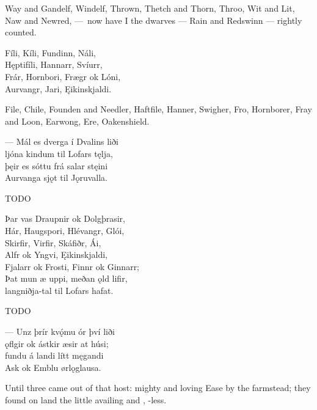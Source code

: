 \bvb Way and Gandelf, Windelf, Thrown, Thetch and Thorn, Throo, Wit and Lit, Naw and Newred, — now have I the dwarves — Rain and Redswinn — rightly counted.\evb

\bva Fíli, Kíli, \hld Fundinn, Náli, \\%
Hęptifíli, \hld Hannarr, Svíurr, \\%
Frár, Hornbori, \hld Frægr ok Lóni, \\%
Aurvangr, Jari, \hld Ęikinskjaldi.\eva

\bvb File, Chile, Founden and Needler, Haftfile, Hanner, Swigher, Fro, Hornborer, Fray and Loon, Earwong, Ere, Oakenshield.\evb

\bva — Mál es dverga \hld í Dvalins liði \\%
ljóna kindum \hld til Lofars tęlja, \\%
þęir es sóttu \hld frá salar stęini \\%
Aurvanga sjǫt \hld til Jǫruvalla.\footnotemark[1]\eva
{}

\bvb TODO\evb

\bva Þar vas Draupnir \hld ok Dolgþrasir, \\%
Hár, Haugspori, \hld Hlévangr, Glói, \\%
Skirfir, Virfir, \hld Skáfiðr, Ái, \\%
Alfr ok Yngvi, \hld Ęikinskjaldi, \\%
Fjalarr ok Frosti, \hld Finnr ok Ginnarr; \\%
Þat mun æ uppi, \hld meðan ǫld lifir, \\%
langniðja-tal \hld til Lofars hafat.\eva

\bvb TODO\evb


\bva — Unz þrír kvǫ́mu \hld ór því liði \\%
ǫflgir ok ástkir \hld æsir at húsi; \\%
fundu á landi \hld lítt męgandi \\%
Ask ok Emblu \hld ørlǫglausa.\eva

\bvb Until three came out of that host: mighty and loving Ease by the farmstead; they found on land the little availing  and , -less.\footnotemark[1]\evb
{}

